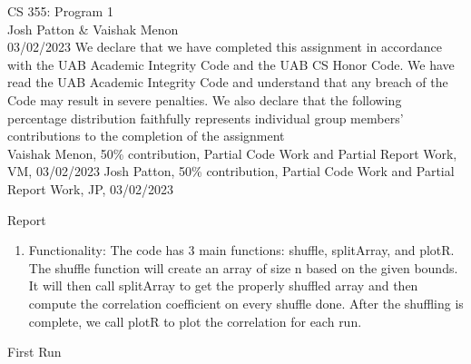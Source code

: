 \documentclass[12pt]{article}
\begin{document}
	\begin{titlepage}
		\begin{center}
			\hspace{0pt}
				\vfill
					\Huge CS 355: Program 1\\
					\Large Josh Patton \& Vaishak Menon\\
					\Large 03/02/2023
				\vfill
			\hspace{0pt}
            \small We declare that we have completed this assignment in accordance with 
            the UAB Academic Integrity Code and the UAB CS Honor Code. We have 
            read the UAB Academic Integrity Code and understand that any breach 
            of the Code may result in severe penalties.
            We  also  declare  that  the  following  percentage  distribution 
            faithfully  represents  individual  group  members’  contributions  to 
            the completion of the assignment\\
            \small Vaishak Menon, 50\% contribution, Partial Code Work and Partial Report Work, VM, 03/02/2023
            \small Josh Patton, 50\% contribution, Partial Code Work and Partial Report Work, JP, 03/02/2023
		\end{center}
	\end{titlepage}
	\newpage
	\begin{center}
	\Large Report\\
	\end{center}
    \begin{enumerate}
        \item Functionality:
        \subitem The code has 3 main functions: shuffle, splitArray, and plotR. The shuffle function will create an array
        of size n based on the given bounds. It will then call splitArray to get the properly shuffled array and 
        then compute the correlation coefficient on every shuffle done. After the shuffling is complete, we call plotR to 
        plot the correlation for each run.
    \end{enumerate}
    \begin{center}
        \small First Run
    \end{center}
\end{document}
